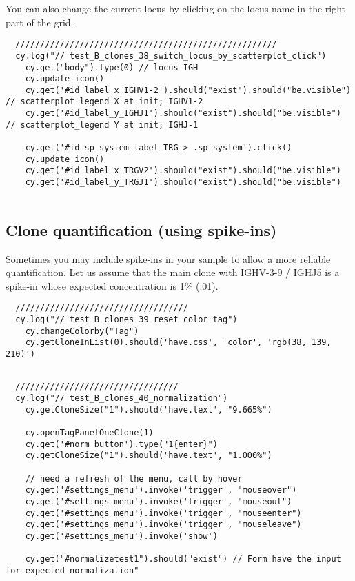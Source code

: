 You can also change the current locus by clicking on the locus name in the
right part of the grid.
\begin{verbatim}
  /////////////////////////////////////////////////////
  cy.log("// test_B_clones_38_switch_locus_by_scatterplot_click")
    cy.get("body").type(0) // locus IGH
    cy.update_icon()
    cy.get('#id_label_x_IGHV1-2').should("exist").should("be.visible") // scatterplot_legend X at init; IGHV1-2
    cy.get('#id_label_y_IGHJ1').should("exist").should("be.visible")   // scatterplot_legend Y at init; IGHJ-1

    cy.get('#id_sp_system_label_TRG > .sp_system').click()
    cy.update_icon()
    cy.get('#id_label_x_TRGV2').should("exist").should("be.visible")
    cy.get('#id_label_y_TRGJ1').should("exist").should("be.visible")


\end{verbatim}

\subsection{Clone quantification (using spike-ins)}

Sometimes you may include spike-ins in your sample to allow a more reliable
quantification.
Let us assume that the main clone with IGHV-3-9 / IGHJ5 is a spike-in whose
expected concentration is 1\% (.01).

\begin{verbatim}
  ///////////////////////////////////
  cy.log("// test_B_clones_39_reset_color_tag")
    cy.changeColorby("Tag")
    cy.getCloneInList(0).should('have.css', 'color', 'rgb(38, 139, 210)')


\end{verbatim}

\begin{verbatim}
  /////////////////////////////////
  cy.log("// test_B_clones_40_normalization")
    cy.getCloneSize("1").should('have.text', "9.665%")

    cy.openTagPanelOneClone(1)
    cy.get('#norm_button').type("1{enter}")
    cy.getCloneSize("1").should('have.text', "1.000%")

    // need a refresh of the menu, call by hover
    cy.get('#settings_menu').invoke('trigger', "mouseover")
    cy.get('#settings_menu').invoke('trigger', "mouseout")
    cy.get('#settings_menu').invoke('trigger', "mouseenter")
    cy.get('#settings_menu').invoke('trigger', "mouseleave")
    cy.get('#settings_menu').invoke('show')

    cy.get("#normalizetest1").should("exist") // Form have the input for expected normalization"


\end{verbatim}

